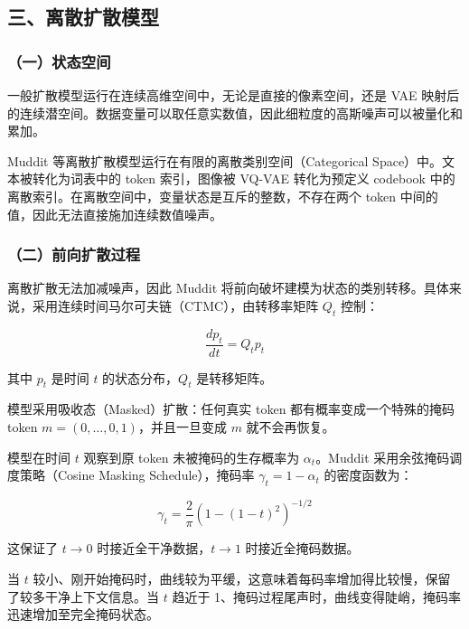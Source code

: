\hypertarget{ux4e09ux79bbux6563ux6269ux6563ux6a21ux578b}{%
\subsection{三、离散扩散模型}\label{ux4e09ux79bbux6563ux6269ux6563ux6a21ux578b}}

\hypertarget{ux4e00ux72b6ux6001ux7a7aux95f4}{%
\subsubsection{（一）状态空间}\label{ux4e00ux72b6ux6001ux7a7aux95f4}}

一般扩散模型运行在连续高维空间中，无论是直接的像素空间，还是 VAE 映射后的连续潜空间。数据变量可以取任意实数值，因此细粒度的高斯噪声可以被量化和累加。

Muddit 等离散扩散模型运行在有限的离散类别空间（Categorical Space）中。文本被转化为词表中的 token 索引，图像被 VQ-VAE 转化为预定义 codebook 中的离散索引。在离散空间中，变量状态是互斥的整数，不存在两个 token 中间的值，因此无法直接施加连续数值噪声。

\hypertarget{ux4e8cux524dux5411ux6269ux6563ux8fc7ux7a0b}{%
\subsubsection{（二）前向扩散过程}\label{ux4e8cux524dux5411ux6269ux6563ux8fc7ux7a0b}}

离散扩散无法加减噪声，因此 Muddit 将前向破坏建模为状态的类别转移。具体来说，采用连续时间马尔可夫链（CTMC），由转移率矩阵 \(Q_t\) 控制：

\[
\frac{dp_t}{dt}=Q_t p_t
\]

其中 \(p_t\) 是时间 \(t\) 的状态分布，\(Q_t\) 是转移矩阵。

模型采用吸收态（Masked）扩散：任何真实 token 都有概率变成一个特殊的掩码 token \(m=(0,\ldots,0,1)\)，并且一旦变成 \(m\) 就不会再恢复。

模型在时间 \(t\) 观察到原 token 未被掩码的生存概率为 \(\alpha_t\)。Muddit 采用余弦掩码调度策略（Cosine Masking Schedule），掩码率 \(\gamma_t=1-\alpha_t\) 的密度函数为：

\[
\gamma_t=\frac{2}{\pi}\left(1-(1-t)^2\right)^{-1/2}
\]

这保证了 \(t\to 0\) 时接近全干净数据，\(t\to 1\) 时接近全掩码数据。

当 \(t\) 较小、刚开始掩码时，曲线较为平缓，这意味着每码率增加得比较慢，保留了较多干净上下文信息。当 \(t\) 趋近于 1、掩码过程尾声时，曲线变得陡峭，掩码率迅速增加至完全掩码状态。

